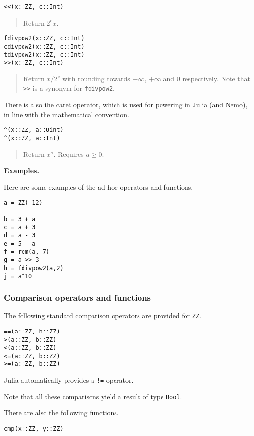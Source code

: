 \documentclass[a4paper,10pt]{article}
\newcommand{\code}{\lstinline}
\newcommand{\desc}[1]{\vspace{-3mm}\begin{quote}#1\end{quote}}
\begin{document}
{{{\begin{lstlisting}
<<(x::ZZ, c::Int)
\end{lstlisting}

\desc{Return $2^c x$.}

\begin{lstlisting}
fdivpow2(x::ZZ, c::Int)
cdivpow2(x::ZZ, c::Int)
tdivpow2(x::ZZ, c::Int)
>>(x::ZZ, c::Int)
\end{lstlisting}

\desc{Return $x/2^c$ with rounding towards $-\infty$, $+\infty$ and $0$ respectively. 
Note that \code{>>} is a synonym for \code{fdivpow2}.}

There is also the caret operator, which is used for powering in Julia (and Nemo), in
line with the mathematical convention.

\begin{lstlisting}
^(x::ZZ, a::Uint)
^(x::ZZ, a::Int)
\end{lstlisting}

\desc{Return $x^a$. Requires $a \geq 0$.}

\textbf{Examples.}

Here are some examples of the ad hoc operators and functions.

\begin{lstlisting}
a = ZZ(-12)

b = 3 + a
c = a + 3
d = a - 3
e = 5 - a
f = rem(a, 7)
g = a >> 3
h = fdivpow2(a,2)
j = a^10
\end{lstlisting}

\subsubsection{Comparison operators and functions}

The following standard comparison operators are provided for \code{ZZ}.

\begin{lstlisting}
==(a::ZZ, b::ZZ)
>(a::ZZ, b::ZZ)
<(a::ZZ, b::ZZ)
<=(a::ZZ, b::ZZ)
>=(a::ZZ, b::ZZ)
\end{lstlisting}

Julia automatically provides a \code{!=} operator.

Note that all these comparisons yield a result of type \code{Bool}.

There are also the following functions.

\begin{lstlisting}
cmp(x::ZZ, y::ZZ)
\end{lstlisting}

}}}
\end{document}
